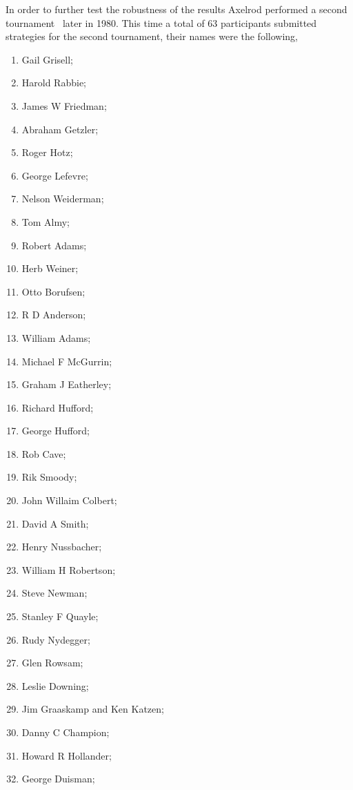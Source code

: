 \documentclass{article}
\theoremstyle{definition}
\begin{document}
In order to further test the robustness of the results Axelrod performed a second
tournament~\cite{Axelrod1980b} later in 1980. This time a total of 63 participants
submitted strategies for the second tournament, their names were the following,

\begin{multicols}{3}
    \begin{enumerate}
        \item Gail Grisell;
        \item Harold Rabbie;
        \item James W Friedman;
        \item Abraham Getzler;
        \item Roger Hotz;
        \item George Lefevre;
        \item Nelson Weiderman;
        \item Tom Almy;
        \item Robert Adams;
        \item Herb Weiner;
        \item Otto Borufsen;
        \item R D Anderson;
        \item William Adams;
        \item Michael F McGurrin;
        \item Graham J Eatherley;
        \item Richard Hufford;
        \item George Hufford;
        \item Rob Cave;
        \item Rik Smoody;
        \item John Willaim Colbert;
        \item David A Smith;
        \item Henry Nussbacher;
        \item William H Robertson;
        \item Steve Newman;
        \item Stanley F Quayle;
        \item Rudy Nydegger;
        \item Glen Rowsam;
        \item Leslie Downing;
        \item Jim Graaskamp and Ken Katzen;
        \item Danny C Champion;
        \item Howard R Hollander;
        \item George Duisman;

\end{enumerate}
\end{multicols}
\end{document}
